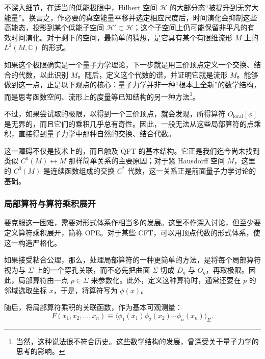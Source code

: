 不深入细节，在适当的低能极限中，Hilbert 空间 $\mathcal{H}$ 的大部分态“被提升到无穷大能量”。换言之，作必要的真空能量平移并选定相应尺度后，时间演化会抑制这些高能态，投影到某个低能子空间 $\mathcal{H}'\subset\mathcal{H}$；这个子空间上仍可能保留非平凡的有效时间演化。对于剩下的空间，最简单的猜想，是它具有某个有限维流形 $M$ 上的 $L^2(M,\mathbb{C})$ 的形式。

如果这个极限确实是一个量子力学理论，下一步就是用三价顶点定义一个交换、结合的代数，以此识别 $M$。随后，定义这个代数的谱，并证明它就是流形 $M$。能够做到这一点，正是以下观点的核心：量子力学并非一种“根本上全新”的数学结构，而是思考函数空间、流形上的度量等已知结构的另一种方法\footnote{当然，这种说法很不符合历史。这些数学结构的发展，曾深受关于量子力学的思考的影响。}。

不过，如果尝试取的极限，以得到一个三价顶点，就会发现，所得算符 $O_{\mathrm{local}}[\phi]$ 是无界的，而且它们的乘积几乎总有奇性。因此，一般无法从这些局部算符的点乘积，直接得到量子力学中那种自然的交换、结合代数。

这一障碍不仅是技术上的，而且触及 QFT 的基本结构。它正是我们迄今尚未找到类似 $C^0(M)\leftrightarrow M$ 那样简单关系的主要原因；对于紧 Hausdorff 空间 $M$，这里的 $C^0(M)$ 是连续函数组成的交换 $C^*$ 代数，这一关系正是前面量子力学讨论的基础。

\subsubsection{局部算符与算符乘积展开}\label{sec:3.2.1.2}

要克服这一困难，需要对形式体系作相当多的发展。这里不作深入讨论，但至少要定义算符乘积展开，简称 OPE。对于某些 CFT，可以用顶点代数的形式体系，使这一构造严格化。

如果接受粘合公理，那么，处理局部算符的一种更简单的方法，是将每个局部算符视为与 $\Sigma$ 上的一个穿孔关联，而不必先把曲面 $\Sigma$ 切成 $D_g$ 与 $O_g$，再取极限。因此，局部算符由一点 $p\in\Sigma$ 来参数化。此外，定义这种算符时，通常还要在 $p$ 的邻域选取坐标 $x$，于是，将算符写为 $\phi(x)$。

随后，将局部算符乘积的关联函数，作为基本可观测量：
\begin{equation}\label{eq:3.22}
F(x_1,x_2,\ldots,x_n)
\equiv\bigl\langle\phi_1(x_1)\phi_2(x_2)\cdots\phi_n(x_n)\bigr\rangle_\Sigma.
\end{equation}

